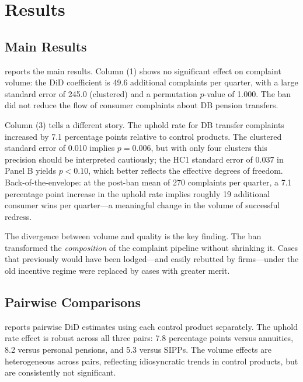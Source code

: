 \documentclass[12pt]{article}
\begin{document}
\section{Results}

\subsection{Main Results}



 reports the main results. Column (1) shows no significant effect on complaint volume: the DiD coefficient is 49.6 additional complaints per quarter, with a large standard error of 245.0 (clustered) and a permutation $p$-value of 1.000. The ban did not reduce the flow of consumer complaints about DB pension transfers.

Column (3) tells a different story. The uphold rate for DB transfer complaints increased by 7.1 percentage points relative to control products. The clustered standard error of 0.010 implies $p = 0.006$, but with only four clusters this precision should be interpreted cautiously; the HC1 standard error of 0.037 in Panel B yields $p < 0.10$, which better reflects the effective degrees of freedom. Back-of-the-envelope: at the post-ban mean of 270 complaints per quarter, a 7.1 percentage point increase in the uphold rate implies roughly 19 additional consumer wins per quarter---a meaningful change in the volume of successful redress.

The divergence between volume and quality is the key finding. The ban transformed the \textit{composition} of the complaint pipeline without shrinking it. Cases that previously would have been lodged---and easily rebutted by firms---under the old incentive regime were replaced by cases with greater merit.

\subsection{Pairwise Comparisons}



 reports pairwise DiD estimates using each control product separately. The uphold rate effect is robust across all three pairs: 7.8 percentage points versus annuities, 8.2 versus personal pensions, and 5.3 versus SIPPs. The volume effects are heterogeneous across pairs, reflecting idiosyncratic trends in control products, but are consistently not significant.
\end{document}
